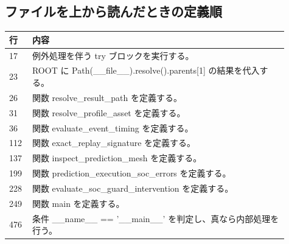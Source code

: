 \documentclass[a4paper,11pt]{article}
\begin{document}
        \subsection{ファイルを上から読んだときの定義順}
            \begin{longtable}{p{0.07\linewidth} p{0.84\linewidth}}
            \toprule
            行 & 内容 \\
            \midrule
            17 & 例外処理を伴う try ブロックを実行する。 \\
23 & ROOT に Path(\_\_file\_\_).resolve().parents[1] の結果を代入する。 \\
26 & 関数 resolve\_result\_path を定義する。 \\
31 & 関数 resolve\_profile\_asset を定義する。 \\
36 & 関数 evaluate\_event\_timing を定義する。 \\
112 & 関数 exact\_replay\_signature を定義する。 \\
137 & 関数 inspect\_prediction\_mesh を定義する。 \\
199 & 関数 prediction\_execution\_soc\_errors を定義する。 \\
228 & 関数 evaluate\_soc\_guard\_intervention を定義する。 \\
249 & 関数 main を定義する。 \\
476 & 条件 \_\_name\_\_ == '\_\_main\_\_' を判定し、真なら内部処理を行う。 \\
            \bottomrule
            \end{longtable}
\end{document}
